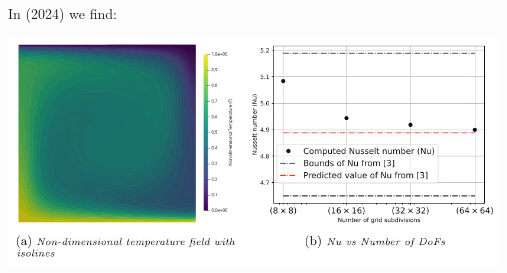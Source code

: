 In \textcite{ildk24} (2024) we find:
\begin{center}
\includegraphics[width=13cm]{images/benchmark_blbc89/ildk24}
\end{center}




